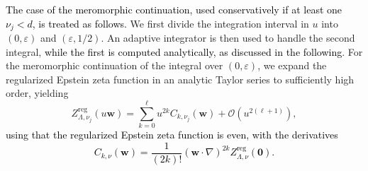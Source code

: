 \documentclass[]{amsart}
\numberwithin{mythm}{section}
\newcommand{\new}[1]{{\textcolor{black}{#1}}}
\begin{document}
\new{The case of the meromorphic continuation, used conservatively if at least one $\nu_j < d$, is treated as follows.} We first divide the integration interval in $u$ into  $(0,\varepsilon)$ and $(\varepsilon,1/2)$. An adaptive integrator is then used to handle the second integral, \new{while the first is computed analytically, as discussed in the following}. For the meromorphic continuation of the integral over $(0,\varepsilon)$, we expand the regularized Epstein zeta function in an analytic Taylor series to sufficiently high order, yielding
\[
Z^\mathrm{reg}_{\Lambda,\nu_j}(u\bm w) = \sum_{k=0}^\ell u^{2k} C_{k,\nu_j}(\bm w) +\mathcal O (u^{2(\ell+1)}),
\]
\new{using that the regularized Epstein zeta function is even, with the derivatives}
\new{\[C_{k,\nu}(\bm w) =\frac{1}{(2k)!}(\bm w\cdot \nabla)^{2k} Z^{\mathrm{reg}}_{\Lambda,\nu}(\bm 0).
\]}
\end{document}
